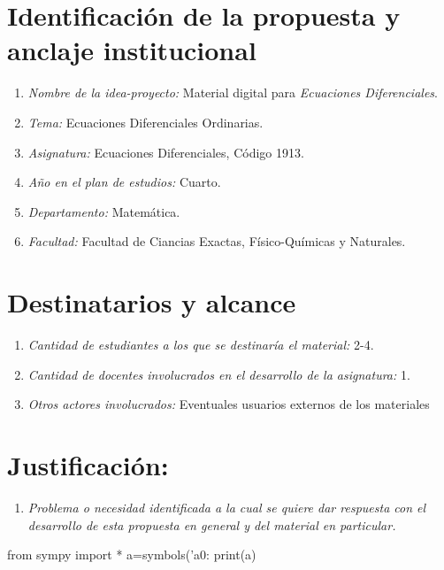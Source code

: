 \documentclass[a4paper,10pt]{report}
\title{}
\author{}
\begin{document}
 \section*{Identificación de la propuesta y anclaje institucional}
 \begin{enumerate}
  \item \emph{Nombre de la idea-proyecto:} Material digital para 
  \emph{Ecuaciones Diferenciales}.
  \item \emph{Tema:} Ecuaciones Diferenciales Ordinarias.
  \item \emph{Asignatura:} Ecuaciones Diferenciales, Código 1913.
  \item \emph{Año en el plan de estudios:} Cuarto.
  \item \emph{Departamento:} Matemática.
  \item \emph{Facultad:} Facultad de Ciancias Exactas, Físico-Químicas y Naturales.
  
 \end{enumerate}
\section*{Destinatarios y alcance}
\begin{enumerate}
 \item \emph{Cantidad de estudiantes a los que se destinaría el material:} 2-4.
 \item \emph{Cantidad de docentes involucrados en el desarrollo de la asignatura:} 1.
 \item \emph{Otros actores involucrados:} Eventuales usuarios externos de los materiales
\end{enumerate}

\section*{Justificación:} 
\begin{enumerate}
 \item \emph{Problema o necesidad identificada a la cual se quiere 
 dar respuesta con el desarrollo de esta propuesta en general y del material en particular.}
 
\end{enumerate}
\begin{pyblock}
from sympy import *
a=symbols('a0:%
print(a)
\end{pyblock}
\end{document}
